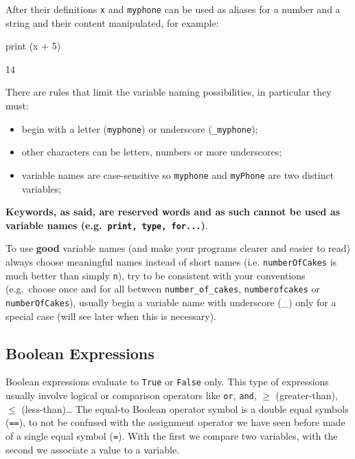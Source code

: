 After their definitions \texttt{x} and \texttt{myphone} can be used as aliases for a number and a string and their content manipulated, for example:

\begin{ipython}
print (x + 5)
\end{ipython}
\begin{ioutput}
14
\end{ioutput}

There are rules that limit the variable naming possibilities, in particular they must:
\begin{itemize}
\tightlist
\item begin with a letter (\texttt{myphone}) or underscore (\texttt{\_myphone});
\item other characters can be letters, numbers or more underscores;
\item variable names are case-sensitive so \texttt{myphone} and \texttt{myPhone} are two distinct variables;
\end{itemize}

\textbf{Keywords, as said, are reserved words and as such cannot be used as variable names (e.g.~\texttt{print, type, for...})}.

To use \textbf{good} variable names (and make your programs clearer and easier to read) always choose meaningful names instead of short names (i.e. \texttt{numberOfCakes} is much better than simply \texttt{n}), try to be consistent with your conventions (e.g.~choose once and for all between \texttt{number\_of\_cakes}, \texttt{numberofcakes} or \texttt{numberOfCakes}), usually begin a variable name with underscore (\_) only for a special case (will see later when this is necessary).

\subsection{Boolean Expressions}\label{boolean-expressions}

Boolean expressions evaluate to \texttt{True} or \texttt{False} only. This type
of expressions usually involve logical or comparison operators like \texttt{or}, \texttt{and}, $\geq$ (greater-than), $\leq$ (less-than)\ldots
The equal-to Boolean operator symbol is a double equal symbols (\texttt{==}), to not be confused with the assignment operator we have seen before made of a single equal symbol (\texttt{=}). With the first we compare two variables, with the second we associate a value to a variable.

